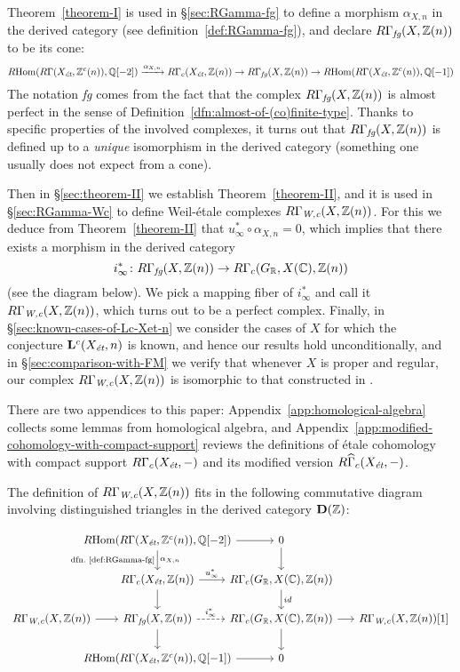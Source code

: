 \documentclass{article}
\numberwithin{equation}{section}
\begin{document}
Theorem~\ref{theorem-I} is used in \S\ref{sec:RGamma-fg} to define a morphism
$\alpha_{X,n}$ in the derived category (see definition~\ref{def:RGamma-fg}),
and declare $R\Gamma_\fg (X, \ZZ(n))$ to be its cone:
\[ \RHom (R\Gamma (X_\et, \ZZ^c (n)), \QQ [-2]) \xrightarrow{\alpha_{X,n}}
  R\Gamma_c (X_\et, \ZZ (n)) \to
  R\Gamma_\fg (X, \ZZ(n)) \to
  \RHom (R\Gamma (X_\et, \ZZ^c (n)), \QQ [-1]) \]
The notation \emph{fg} comes from the fact that the complex
$R\Gamma_\fg (X, \ZZ(n))$ is almost perfect in the sense of
Definition~\ref{dfn:almost-of-(co)finite-type}. Thanks to specific properties
of the involved complexes, it turns out that $R\Gamma_\fg (X, \ZZ(n))$ is
defined up to a \emph{unique} isomorphism in the derived category (something one
usually does not expect from a cone).

Then in \S\ref{sec:theorem-II} we establish Theorem~\ref{theorem-II}, and it is
used in \S\ref{sec:RGamma-Wc} to define Weil-étale complexes
$R\Gamma_\Wc (X, \ZZ(n))$. For this we deduce from Theorem~\ref{theorem-II} that
$u_\infty^* \circ \alpha_{X,n} = 0$, which implies that there exists a morphism
in the derived category
$$i_\infty^*\colon R\Gamma_\fg (X, \ZZ (n)) \to R\Gamma_c (G_\RR, X (\CC), \ZZ(n))$$
(see the diagram below). We pick a mapping fiber of $i_\infty^*$ and call it
$R\Gamma_\Wc (X, \ZZ (n))$, which turns out to be a perfect complex.
Finally, in \S\ref{sec:known-cases-of-Lc-Xet-n} we consider the cases of $X$ for
which the conjecture $\mathbf{L}^c (X_\et, n)$ is known, and hence our results
hold unconditionally, and in \S\ref{sec:comparison-with-FM} we verify that
whenever $X$ is proper and regular, our complex $R\Gamma_\Wc (X, \ZZ (n))$ is
isomorphic to that constructed in \cite{Flach-Morin-2018}.

There are two appendices to this paper: Appendix~\ref{app:homological-algebra}
collects some lemmas from homological algebra, and
Appendix~\ref{app:modified-cohomology-with-compact-support} reviews the
definitions of étale cohomology with compact support $R\Gamma_c (X_\et, -)$
and its modified version $R\widehat{\Gamma}_c (X_\et, -)$.

\vspace{1em}

The definition of $R\Gamma_\Wc (X,\ZZ(n))$ fits in the following commutative
diagram involving distinguished triangles in the derived category
$\mathbf{D} (\ZZ)$:

\[ \begin{tikzcd}[column sep=1.5em]
    &[-3em] \RHom (R\Gamma (X_\et, \ZZ^c (n)), \QQ [-2]) \ar{d}{\alpha_{X,n}}[swap]{\text{dfn.~\ref{def:RGamma-fg}}} \ar{r} &[-2.5em] 0 \ar{d} \\
    & R\Gamma_c (X_\et, \ZZ(n)) \ar{d}\ar{r}{u_\infty^*} & R\Gamma_c (G_\RR, X (\CC), \ZZ(n))\ar{d}{id} \\
    R\Gamma_\Wc (X, \ZZ (n)) \ar{r} & R\Gamma_\fg (X, \ZZ(n)) \ar[dashed]{r}{i_\infty^*}\ar{d} & R\Gamma_c (G_\RR, X (\CC), \ZZ(n)) \ar{r} \ar{d} & R\Gamma_\Wc (X, \ZZ (n)) [1] \\
    & \RHom (R\Gamma (X_\et, \ZZ^c (n)), \QQ [-1]) \ar{r} & 0
\end{tikzcd} \]
\end{document}
